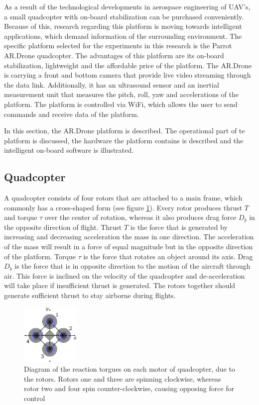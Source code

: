\documentclass[a4paper]{article}
\begin{document}
As a result of the technological developments in aerospace engineering of UAV's, a small quadcopter with on-board stabilization can be purchased conveniently. Because of this, research regarding this platform is moving towards intelligent applications, which demand information of the surrounding environment. The specific platform selected for the experiments in this research is the Parrot AR.Drone quadcopter. The advantages of this platform are its on-board stabilization, lightweight and the affordable price of the platform. The AR.Drone is carrying a front and bottom camera that provide live video streaming through the data link. Additionally, it has an ultrasound sensor and an inertial measurement unit that measures the pitch, roll, yaw and accelerations of the platform. The platform is controlled via WiFi, which allows the user to send commands and receive data of the platform.

In this section, the AR.Drone platform is described. The operational part of te platform is discussed, the hardware the platform contains is described and the intelligent on-board software is illustrated.

\subsection{Quadcopter}
A quadcopter consists of four rotors that are attached to a main frame, which commonly has a cross-shaped form (see figure \ref{quadcopter}). Every rotor produces thrust $T$ and torque $\tau$ over the center of rotation, whereas it also produces drag force $D_b$ in the opposite direction of flight. Thrust $T$ is the force that is generated by increasing and decreasing acceleration the mass in one direction. The acceleration of the mass will result in a force of equal magnitude but in the opposite direction of the platform. Torque $\tau$ is the force that rotates an object around its axis. Drag $D_b$ is the force that is in opposite direction to the motion of the aircraft through air. This force is inclined on the velocity of the quadcopter and de-acceleration will take place if insufficient thrust is generated. The rotors together should generate sufficient thrust to stay airborne during flights.

\begin{figure}[!h]
	\centering
	\includegraphics[width=0.25\textwidth]{images/quadcopter.png}
	\caption{Diagram of the reaction torgues on each motor of quadcopter, due to the rotors. Rotors one and three are spinning clockwise, whereas rotor two and four spin counter-clockwise, causing opposing force for control}
	\label{quadcopter}
\end{figure}
\end{document}
